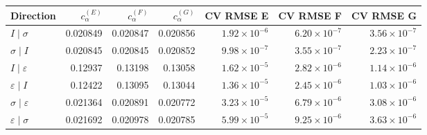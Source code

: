 \begin{tabular}{lrrrrrr}\toprule
Direction & $c_\alpha^{(E)}$ & $c_\alpha^{(F)}$ & $c_\alpha^{(G)}$ & CV RMSE E & CV RMSE F & CV RMSE G\\\midrule
$I\mid \sigma$ & 0.020849 & 0.020847 & 0.020856 & $1.92\!\times\!10^{-6}$ & $6.20\!\times\!10^{-7}$ & $3.56\!\times\!10^{-7}$\\
$\sigma\mid I$ & 0.020845 & 0.020845 & 0.020852 & $9.98\!\times\!10^{-7}$ & $3.55\!\times\!10^{-7}$ & $2.23\!\times\!10^{-7}$\\
$I\mid \varepsilon$ & 0.12937 & 0.13198 & 0.13058 & $1.62\!\times\!10^{-5}$ & $2.82\!\times\!10^{-6}$ & $1.14\!\times\!10^{-6}$\\
$\varepsilon\mid I$ & 0.12422 & 0.13095 & 0.13044 & $1.36\!\times\!10^{-5}$ & $2.45\!\times\!10^{-6}$ & $1.03\!\times\!10^{-6}$\\
$\sigma\mid \varepsilon$ & 0.021364 & 0.020891 & 0.020772 & $3.23\!\times\!10^{-5}$ & $6.79\!\times\!10^{-6}$ & $3.08\!\times\!10^{-6}$\\
$\varepsilon\mid \sigma$ & 0.021692 & 0.020978 & 0.020785 & $5.99\!\times\!10^{-5}$ & $9.25\!\times\!10^{-6}$ & $3.63\!\times\!10^{-6}$\\
\bottomrule\end{tabular}
